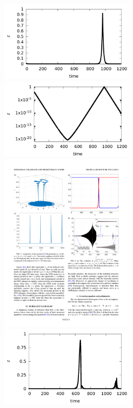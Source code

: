 \includegraphics[width=0.5\textwidth]{i/z.pdf}
\includegraphics[width=0.5\textwidth]{i/logz.pdf}
\\
\includegraphics[width=0.5\textwidth]{i/p2.pdf}
\includegraphics[width=0.5\textwidth]{i/p.pdf}

\eframe
